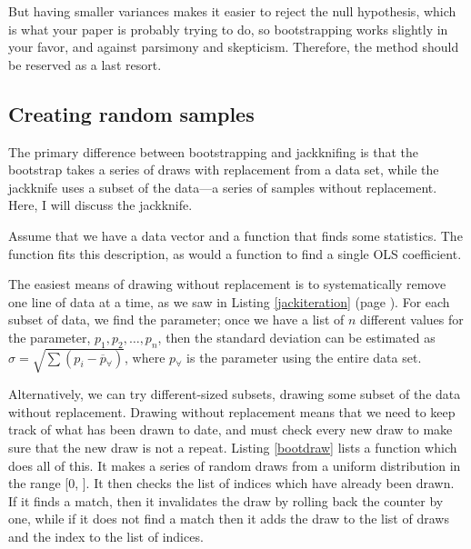 
But having smaller variances makes
it easier to reject the null hypothesis, which is what your paper is
probably trying to do, so bootstrapping works slightly in your favor,
and against parsimony and skepticism. Therefore, the method should be
reserved as a last resort.

\subsection{Creating random samples} 
The primary difference between bootstrapping and jackknifing is that
the bootstrap takes a series of draws with replacement from a data set,
while the jackknife uses a subset of the data---a series of samples
without replacement. Here, I will discuss the jackknife.

Assume that we have a
data vector  and a function  that finds some statistics. The
function  fits this description, as would a function to find
a single OLS coefficient.


The easiest means of drawing without replacement is to
systematically remove one line of data at a time, as we saw in Listing
\ref{jackiteration} (page \pageref{jackiteration}). For each subset of data, we find the parameter;
once we have a list of $n$ different values for the parameter, $p_1,
p_2, \dots, p_n$, then the standard deviation can be estimated as
$\hat\sigma = \sqrt{\sum{(p_i - \overline p_{\forall})}}$, where $p_{\forall}$ is
the parameter using the entire data set.


Alternatively, we can try different-sized subsets,
drawing some subset of the data
without replacement. Drawing without replacement means that we need to
keep track of what has been drawn to date, and must check every new draw
to make sure that the new draw is not a repeat. Listing \ref{bootdraw} lists a function which
does all of this. It makes a series of random draws from a uniform distribution in the range
[0, ]. It then checks the list of indices which have
already been drawn. If it finds a match, then it invalidates the draw
by rolling back the counter by one, while if it does not find a match then it
adds the draw to the list of draws and the index to the list of indices.

